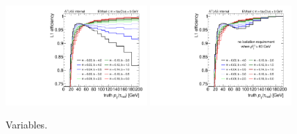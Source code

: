 \begin{figure}[tp]
  \centering
  \includegraphics[width=0.48\textwidth]{figures/trigger/iso_turnonL1_noTAU60}
  \includegraphics[width=0.48\textwidth]{figures/trigger/iso_turnonL1_yesTAU60}
  \caption{Variables.}
  \label{fig:prospects-trigger-isolation-turnon}
\end{figure}

